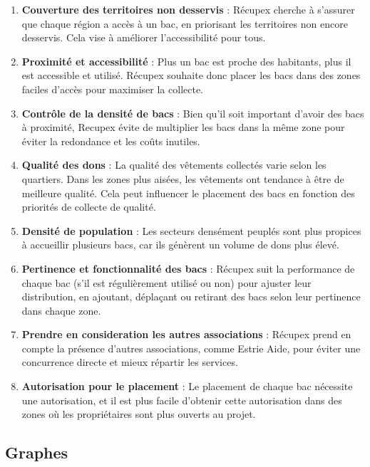 \documentclass[11pt]{article}
\begin{document}
\begin{enumerate}
    \item \textbf{Couverture des territoires non desservis} : Récupex cherche à s’assurer que chaque région a accès à un bac, en priorisant les territoires non encore desservis. Cela vise à améliorer l’accessibilité pour tous.

    \item \textbf{Proximité et accessibilité} : Plus un bac est proche des habitants, plus il est accessible et utilisé. Récupex souhaite donc placer les bacs dans des zones faciles d’accès pour maximiser la collecte.

    \item \textbf{Contrôle de la densité de bacs} : Bien qu’il soit important d’avoir des bacs à proximité, Recupex évite de multiplier les bacs dans la même zone pour éviter la redondance et les coûts inutiles.

    \item\textbf{Qualité des dons} : La qualité des vêtements collectés varie selon les quartiers. Dans les zones plus aisées, les vêtements ont tendance à être de meilleure qualité. Cela peut influencer le placement des bacs en fonction des priorités de collecte de qualité.

    \item\textbf{Densité de population} :  Les secteurs densément peuplés sont plus propices à accueillir plusieurs bacs, car ils génèrent un volume de dons plus élevé.

    \item\textbf{Pertinence et fonctionnalité des bacs} : Récupex suit la performance de chaque bac (s’il est régulièrement utilisé ou non) pour ajuster leur distribution, en ajoutant, déplaçant ou retirant des bacs selon leur pertinence dans chaque zone.

    \item\textbf{Prendre en consideration les autres associations} :  Récupex prend en compte la présence d’autres associations, comme Estrie Aide, pour éviter une concurrence directe et mieux répartir les services.

    \item\textbf{Autorisation pour le placement} : Le placement de chaque bac nécessite une autorisation, et il est plus facile d’obtenir cette autorisation dans des zones où les propriétaires sont plus ouverts au projet.
\end{enumerate}

\subsection{Graphes}
\end{document}
